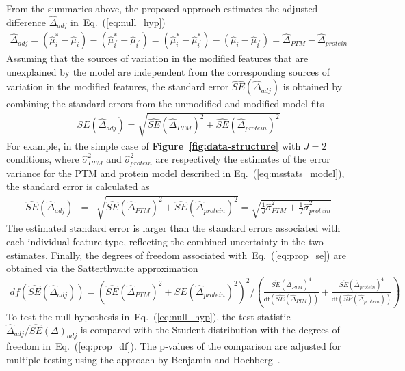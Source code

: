 \documentclass[mcp]{article}
\numberwithin{table}{section}
\def\eqref#1{Eq.~(\ref{eq:#1})}
\def\figref#1{{\bf Figure~\ref{fig:#1}}}
\begin{document}
From the summaries above, the proposed approach estimates the adjusted difference $\hat{\Delta}_{adj}$ in~\eqref{null_hyp}
\begin{eqnarray}
\hat{\Delta}_{adj} = (\hat{\mu}^{\ast}_{i}-\hat{\mu}_{i}) - (\hat{\mu}_{i^{\prime}}^{\ast}-\hat{\mu}_{i^{\prime}}) = (\hat{\mu}^{\ast}_{i}-\hat{\mu}_{i^{\prime}}^{\ast}) - (\hat{\mu}_{i}-\hat{\mu}_{i^{\prime}}) = \hat{\Delta}_{PTM} - \hat{\Delta}_{protein} 
\label{eq:Delta_hat_adj}
\end{eqnarray}
Assuming that the sources of variation in the modified features that are unexplained by the model are independent from the corresponding sources of variation in the modified features, the standard error $\widehat{SE}(\hat{\Delta}_{adj})$ is obtained by combining the standard errors from the unmodified and modified model fits
\begin{eqnarray}
\widehat{SE}(\hat{\Delta}_{adj}) = \sqrt{ \widehat{SE}(\hat{\Delta}_{PTM})^{2} + \widehat{SE}(\hat{\Delta}_{protein})^{2}} 
\label{eq:prop_se}
\end{eqnarray}
For example, in the simple case of \figref{data-structure} with $J=2$ conditions, where $\hat{\sigma}^2_{PTM}$ and $\hat{\sigma}^2_{protein}$ are respectively  the estimates of the error variance for the PTM and protein model described in \eqref{msstats_model}, the standard error is calculated as 
\begin{eqnarray}
 \widehat{SE}(\hat{\Delta}_{adj}) &=& \sqrt{\widehat{SE}(\hat{\Delta}_{PTM})^2 + \widehat{SE}(\hat{\Delta}_{protein})^2} = \sqrt{\frac{1}{J}\hat{\sigma}^2_{PTM} + \frac{1}{J}\hat{\sigma}^2_{protein}}
\label{eq:se_calc}
\end{eqnarray}
The estimated standard error is larger than the standard errors associated with each individual feature type, reflecting the combined uncertainty in the two estimates. 
Finally, the degrees of freedom associated with~\eqref{prop_se} are obtained via the Satterthwaite approximation~\cite{kutner_etal_04a, satterthwaite:1946}
\begin{eqnarray}
df \left(  \widehat{SE}(\hat{\Delta}_{adj}) \right)=  \left( \widehat{SE}(\hat{\Delta}_{PTM})^{2} + \widehat{SE}(\hat{\Delta}_{protein})^{2} \right)^2 \bigg/
\left( \frac{\widehat{SE}(\hat{\Delta}_{PTM})^{4}}{\mathrm{df}(\widehat{SE}(\hat{\Delta}_{PTM}))} + \frac{\widehat{SE}(\hat{\Delta}_{protein})^{4}}{ \mathrm{df}(\widehat{SE}(\hat{\Delta}_{protein}))} \right)
\label{eq:prop_df}
\end{eqnarray}
To test the null hypothesis in~\eqref{null_hyp}, the test statistic $\hat{\Delta}_{adj}/\widehat{SE}(\Delta)_{adj}$ is compared with the Student distribution with the degrees of freedom in~\eqref{prop_df}. The p-values of the comparison are adjusted for multiple testing using the approach by Benjamin and Hochberg~\cite{Benjamini:1995}.
\end{document}
